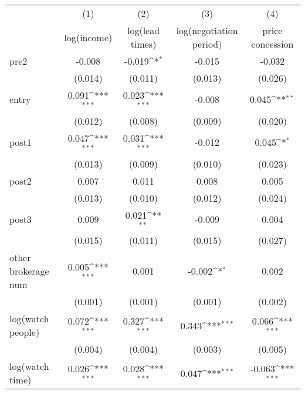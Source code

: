 {
\def\sym#1{\ifmmode^{#1}\else\(^{#1}\)\fi}
\begin{tabular}{l*{4}{c}}
\toprule
            &\multicolumn{1}{c}{(1)}&\multicolumn{1}{c}{(2)}&\multicolumn{1}{c}{(3)}&\multicolumn{1}{c}{(4)}\\
            &\multicolumn{1}{c}{log(income)}&\multicolumn{1}{c}{log(lead times)}&\multicolumn{1}{c}{log(negotiation period)}&\multicolumn{1}{c}{price concession}\\
\midrule
pre2        &      -0.008         &      -0.019\sym{*}  &      -0.015         &      -0.032         \\
            &     (0.014)         &     (0.011)         &     (0.013)         &     (0.026)         \\
\addlinespace
entry       &       0.091\sym{***}&       0.023\sym{***}&      -0.008         &       0.045\sym{**} \\
            &     (0.012)         &     (0.008)         &     (0.009)         &     (0.020)         \\
\addlinespace
post1       &       0.047\sym{***}&       0.031\sym{***}&      -0.012         &       0.045\sym{*}  \\
            &     (0.013)         &     (0.009)         &     (0.010)         &     (0.023)         \\
\addlinespace
post2       &       0.007         &       0.011         &       0.008         &       0.005         \\
            &     (0.013)         &     (0.010)         &     (0.012)         &     (0.024)         \\
\addlinespace
post3       &       0.009         &       0.021\sym{**} &      -0.009         &       0.004         \\
            &     (0.015)         &     (0.011)         &     (0.015)         &     (0.027)         \\
\addlinespace
other brokerage num  &       0.005\sym{***}&       0.001         &      -0.002\sym{*}  &       0.002         \\
            &     (0.001)         &     (0.001)         &     (0.001)         &     (0.002)         \\
\addlinespace
log(watch people)&       0.072\sym{***}&       0.327\sym{***}&       0.343\sym{***}&       0.066\sym{***}\\
            &     (0.004)         &     (0.004)         &     (0.003)         &     (0.005)         \\
\addlinespace
log(watch time)&       0.026\sym{***}&       0.028\sym{***}&       0.047\sym{***}&      -0.063\sym{***}\\

\end{tabular}}

